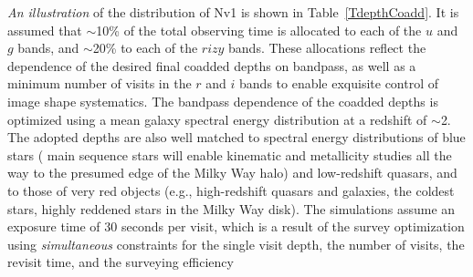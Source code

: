 {\it An illustration}
of the distribution of Nv1 is shown in Table~\ref{TdepthCoadd}.
It is assumed that $\sim$10\% of the total observing time is allocated to
each of the $u$ and $g$ bands, and $\sim$20\% to each of the $rizy$ bands. These allocations
reflect the dependence of the desired final coadded depths on bandpass,
as well as a minimum number of visits in the $r$ and $i$ bands to enable
exquisite control of image shape systematics. The bandpass dependence of
the coadded depths is optimized using a mean galaxy spectral energy
distribution at a redshift of $\sim$2.  The adopted
depths are also well matched to spectral energy distributions of blue stars
( main sequence stars will enable kinematic and
metallicity studies all the way to the presumed edge of the Milky Way halo)
and low-redshift quasars, and to those of very red objects (e.g., high-redshift
quasars and galaxies, the coldest stars, highly reddened stars in the Milky
Way disk). The simulations assume an exposure time of 30 seconds per visit,
which is a result of the survey optimization using {\it simultaneous}
constraints for the single visit depth, the number of visits, the revisit
time, and the surveying efficiency 


